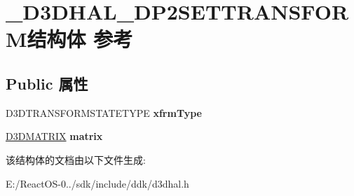 \hypertarget{struct___d3_d_h_a_l___d_p2_s_e_t_t_r_a_n_s_f_o_r_m}{}\section{\+\_\+\+D3\+D\+H\+A\+L\+\_\+\+D\+P2\+S\+E\+T\+T\+R\+A\+N\+S\+F\+O\+R\+M结构体 参考}
\label{struct___d3_d_h_a_l___d_p2_s_e_t_t_r_a_n_s_f_o_r_m}
\subsection*{Public 属性}
\begin{DoxyCompactItemize}
\item 
\mbox{\label{struct___d3_d_h_a_l___d_p2_s_e_t_t_r_a_n_s_f_o_r_m_a32656210678fd4aefebc68a3a79b375a}} 
D3\+D\+T\+R\+A\+N\+S\+F\+O\+R\+M\+S\+T\+A\+T\+E\+T\+Y\+PE {\bfseries xfrm\+Type}
\item 
\mbox{\label{struct___d3_d_h_a_l___d_p2_s_e_t_t_r_a_n_s_f_o_r_m_a221b30f97948a916daa4cda92b3b6168}} 
\hyperlink{struct___d3_d_m_a_t_r_i_x}{D3\+D\+M\+A\+T\+R\+IX} {\bfseries matrix}
\end{DoxyCompactItemize}


该结构体的文档由以下文件生成\+:\begin{DoxyCompactItemize}
\item 
E\+:/\+React\+O\+S-\/0../sdk/include/ddk/d3dhal.\+h\end{DoxyCompactItemize}
